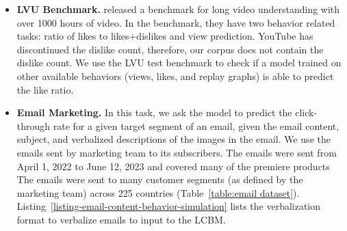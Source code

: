 \begin{enumerate}[leftmargin=*]
    \begin{itemize}
        \item\textbf{LVU Benchmark.} \citet{wu2021towards} released a benchmark for long video understanding with over 1000 hours of video. In the benchmark, they have two behavior related tasks: ratio of likes to likes+dislikes and view prediction. YouTube has discontinued the dislike count, therefore, our corpus does not contain the dislike count. We use the LVU test benchmark to check if a model trained on other available behaviors (views, likes, and replay graphs) is able to predict the like ratio.
        
        \item\textbf{\companyName Email Marketing.} In this task, we ask the model to predict the click-through rate for a given target segment of an email, given the email content, subject, and verbalized descriptions of the images in the email. We use the emails sent by \companyName marketing team to its subscribers. The emails were sent from April 1, 2022 to June 12, 2023 and covered many of the premiere products %
        The emails were sent to many customer segments (as defined by the marketing team) across 225 countries (Table~\ref{table:email dataset}). Listing~\ref{listing-email-content-behavior-simulation} lists the verbalization format to verbalize emails to input to the LCBM. 
    \end{itemize}
\end{enumerate}





